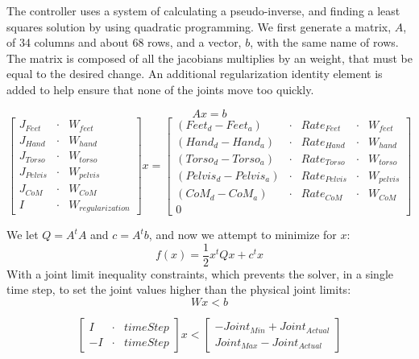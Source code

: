 \documentclass{article}
\begin{document}
The controller uses a system of calculating a pseudo-inverse, and finding a least squares solution by using quadratic programming. We first generate a matrix, $A$, of 34 columns and about 68 rows, and a vector, $b$, with the same name of rows. The matrix is composed of all the jacobians multiplies by an weight, that must be equal to the desired change. An additional regularization identity element is added to help ensure that none of the joints move too quickly. 

\begin{equation} 
Ax = b 
\end{equation}
\begin{equation} 
\begin{bmatrix}
J_{Feet} &\cdot & W_{feet} \\
J_{Hand} &\cdot & W_{hand} \\
J_{Torso} &\cdot & W_{torso} \\
J_{Pelvis} &\cdot & W_{pelvis} \\
J_{CoM} &\cdot & W_{CoM} \\
I &\cdot & W_{regularization}
\end{bmatrix}
x = 
\begin{bmatrix}
(Feet_d - Feet_a) &\cdot & {Rate}_{Feet} &\cdot & W_{feet} \\
(Hand_d - Hand_a) &\cdot & {Rate}_{Hand} &\cdot & W_{hand} \\
(Torso_d - Torso_a) &\cdot & {Rate}_{Torso} &\cdot & W_{torso} \\
(Pelvis_d - Pelvis_a) &\cdot & {Rate}_{Pelvis} &\cdot & W_{pelvis} \\
(CoM_d - CoM_a) &\cdot & {Rate}_{CoM} &\cdot & W_{CoM} \\
0
\end{bmatrix}
\end{equation}

We let $Q=A^tA$ and $c=A^tb$, and now we attempt to minimize for $x$:  
\begin{equation} 
f(x) = \frac{1}{2}x^tQx + c^tx 
\end{equation}
With a joint limit inequality constraints, which prevents the solver, in a single time step, to set the joint values higher than the physical joint limits:
\begin{equation} 
Wx<b
\end{equation}

\begin{equation} 
\begin{bmatrix}
I &\cdot & timeStep \\
-I &\cdot & timeStep 
\end{bmatrix}
x
< 
\begin{bmatrix}
-Joint_{Min} + {Joint}_{Actual} \\
Joint_{Max} - {Joint}_{Actual}
\end{bmatrix}
\end{equation}
\end{document}
